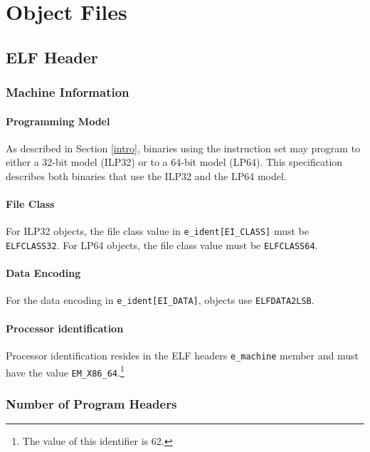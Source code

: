 
\chapter{Object Files}

\section{ELF Header}

\subsection{Machine Information}

\subsubsection{Programming Model}

As described in Section \ref{intro}, binaries using the \xARCH instruction
set may program to either a 32-bit model (ILP32) or to a 64-bit model (LP64).
This specification describes both binaries that use the ILP32 and the LP64
model.

\subsubsection{File Class}

For \xARCH ILP32 objects, the file class value in \texttt{e_ident[EI_CLASS]}
must be \texttt{ELFCLASS32}. For \xARCH LP64 objects, the file class value
must be \texttt{ELFCLASS64}.

\subsubsection{Data Encoding}

For the data encoding in \texttt{e_ident[EI_DATA]}, \xARCH objects use
\texttt{ELFDATA2LSB}.

\subsubsection{Processor identification}

Processor identification resides in the ELF headers
\texttt{e_machine} member and must have the value
\texttt{EM_X86_64}.\footnote{The value of this identifier is 62.}

\subsection{Number of Program Headers}

